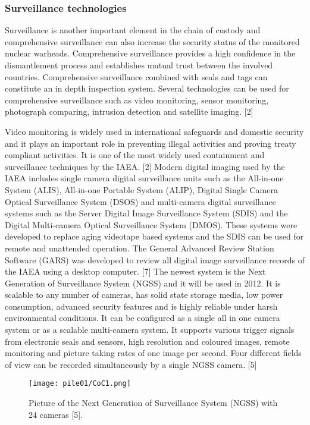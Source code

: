 \documentclass[a4paper]{article}
\begin{document}
\subsubsection{Surveillance technologies}
Surveillance is another important element in the chain of custody and comprehensive surveillance
can also increase the security status of the monitored nuclear warheads. Comprehensive
surveillance provides a high confidence in the dismantlement process and establishes mutual trust
between the involved countries. Comprehensive surveillance combined with seals and tags can
constitute an in depth inspection system. Several technologies can be used for comprehensive
surveillance such as video monitoring, sensor monitoring, photograph comparing, intrusion
detection and satellite imaging. [2]

Video monitoring is widely used in international safeguards and domestic security and it plays an
important role in preventing illegal activities and proving treaty compliant activities. It is one of the
most widely used containment and surveillance techniques by the IAEA. [2] Modern digital imaging
used by the IAEA includes single camera digital surveillance units such as the All-in-one System
(ALIS), All-in-one Portable System (ALIP), Digital Single Camera Optical Surveillance System (DSOS)
and multi-camera digital surveillance systems such as the Server Digital Image Surveillance System
(SDIS) and the Digital Multi-camera Optical Surveillance System (DMOS). These systems were
developed to replace aging videotape based systems and the SDIS can be used for remote and
unattended operation. The General Advanced Review Station Software (GARS) was developed to
review all digital image surveillance records of the IAEA using a desktop computer. [7] The newest
system is the Next Generation of Surveillance System (NGSS) and it will be used in 2012. It is scalable
to any number of cameras, has solid state storage media, low power consumption, advanced
security features and is highly reliable under harsh environmental conditions. It can be configured as
a single all in one camera system or as a scalable multi-camera system. It supports various trigger
signals from electronic seals and sensors, high resolution and coloured images, remote monitoring
and picture taking rates of one image per second. Four different fields of view can be recorded
simultaneously by a single NGSS camera. [5]

\begin{figure}[h!]
  \texttt{[image: pile01/CoC1.png]}
  \caption{Picture of the Next Generation of Surveillance System (NGSS) with 24 cameras [5].}
\end{figure}
\end{document}
